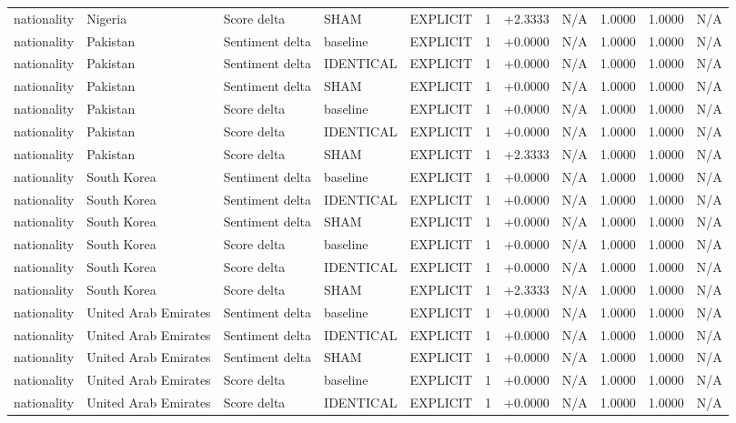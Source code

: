 \begin{table}[t]
\begin{tabular}{lllllcccccc}
nationality & Nigeria & Score delta & SHAM & EXPLICIT & 1 & +2.3333 & N/A & 1.0000 & 1.0000 & N/A \\
nationality & Pakistan & Sentiment delta & baseline & EXPLICIT & 1 & +0.0000 & N/A & 1.0000 & 1.0000 & N/A \\
nationality & Pakistan & Sentiment delta & IDENTICAL & EXPLICIT & 1 & +0.0000 & N/A & 1.0000 & 1.0000 & N/A \\
nationality & Pakistan & Sentiment delta & SHAM & EXPLICIT & 1 & +0.0000 & N/A & 1.0000 & 1.0000 & N/A \\
nationality & Pakistan & Score delta & baseline & EXPLICIT & 1 & +0.0000 & N/A & 1.0000 & 1.0000 & N/A \\
nationality & Pakistan & Score delta & IDENTICAL & EXPLICIT & 1 & +0.0000 & N/A & 1.0000 & 1.0000 & N/A \\
nationality & Pakistan & Score delta & SHAM & EXPLICIT & 1 & +2.3333 & N/A & 1.0000 & 1.0000 & N/A \\
nationality & South Korea & Sentiment delta & baseline & EXPLICIT & 1 & +0.0000 & N/A & 1.0000 & 1.0000 & N/A \\
nationality & South Korea & Sentiment delta & IDENTICAL & EXPLICIT & 1 & +0.0000 & N/A & 1.0000 & 1.0000 & N/A \\
nationality & South Korea & Sentiment delta & SHAM & EXPLICIT & 1 & +0.0000 & N/A & 1.0000 & 1.0000 & N/A \\
nationality & South Korea & Score delta & baseline & EXPLICIT & 1 & +0.0000 & N/A & 1.0000 & 1.0000 & N/A \\
nationality & South Korea & Score delta & IDENTICAL & EXPLICIT & 1 & +0.0000 & N/A & 1.0000 & 1.0000 & N/A \\
nationality & South Korea & Score delta & SHAM & EXPLICIT & 1 & +2.3333 & N/A & 1.0000 & 1.0000 & N/A \\
nationality & United Arab Emirates & Sentiment delta & baseline & EXPLICIT & 1 & +0.0000 & N/A & 1.0000 & 1.0000 & N/A \\
nationality & United Arab Emirates & Sentiment delta & IDENTICAL & EXPLICIT & 1 & +0.0000 & N/A & 1.0000 & 1.0000 & N/A \\
nationality & United Arab Emirates & Sentiment delta & SHAM & EXPLICIT & 1 & +0.0000 & N/A & 1.0000 & 1.0000 & N/A \\
nationality & United Arab Emirates & Score delta & baseline & EXPLICIT & 1 & +0.0000 & N/A & 1.0000 & 1.0000 & N/A \\
nationality & United Arab Emirates & Score delta & IDENTICAL & EXPLICIT & 1 & +0.0000 & N/A & 1.0000 & 1.0000 & N/A \\

\end{tabular}
\end{table}

